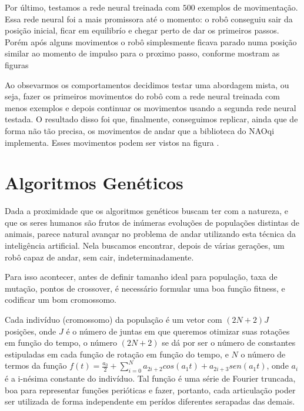 \documentclass[twoside,conference,a4paper]{IEEEtran}
\begin{document}


Por último, testamos a rede neural treinada com $500$ exemplos de movimentação. Essa rede neural foi a mais promissora até o momento: o robô conseguiu sair da posição inicial, ficar em equilibrío e chegar perto de dar os primeiros passos. Porém após alguns movimentos o robô simplesmente ficava parado numa posição similar ao momento de impulso para o proximo passo, conforme mostram as figuras %


Ao obsevarmos os comportamentos decidimos testar uma abordagem mista, ou seja, fazer os primeiros movimentos do robô com a rede neural treinada com menos exemplos e depois continuar os movimentos usando a segunda rede neural testada. O resultado disso foi que, finalmente, conseguimos replicar, ainda que de forma não tão precisa, os movimentos de andar que a biblioteca do NAOqi implementa. Esses movimentos podem ser vistos na figura %
.

\section{Algoritmos Genéticos} \label{algoritmos_geneticos}
Dada a proximidade que os algoritmos genéticos buscam ter com a natureza, e que os seres humanos são frutos de inúmeras evoluções de populações distintas de animais, parece natural avançar no problema de andar utilizando esta técnica da inteligência artificial. Nela buscamos encontrar, depois de várias gerações, um robô capaz de andar, sem cair, indeterminadamente.

Para isso acontecer, antes de definir tamanho ideal para população, taxa de mutação, pontos de crossover, é necessário formular uma boa função fitness, e codificar um bom cromossomo.


Cada indivíduo (cromossomo) da população é um vetor com $(2N+2)J$ posições, onde $J$ é o número de juntas em que queremos otimizar suas rotações em função do tempo, o número $(2N+2)$ se dá por ser o número de constantes estipuladas em cada função de rotação em função do tempo, e $N$ o número de termos da função $f(t) = \frac{a_0}{2}+\sum_{i=0}^N a_{2i+2} cos(a_{1} t) + a_{2i+3} sen(a_{1} t)$, onde $a_i$ é a i-nésima constante do indivíduo. Tal função é uma série de Fourier truncada, boa para representar funções perióticas e fazer, portanto, cada articulação poder ser utilizada de forma independente em perídos diferentes serapadas das demais.
\end{document}
